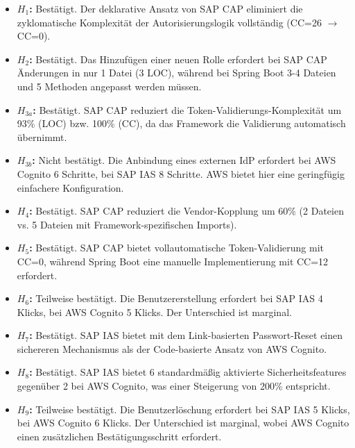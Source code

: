 \begin{itemize}
    \item \textbf{$H_1$:} Bestätigt. Der deklarative Ansatz von \ac{SAP CAP} eliminiert die zyklomatische Komplexität der Autorisierungslogik vollständig (CC=26 $\rightarrow$ CC=0).

    \item \textbf{$H_2$:} Bestätigt. Das Hinzufügen einer neuen Rolle erfordert bei \ac{SAP CAP} Änderungen in nur 1 Datei (3 LOC), während bei Spring Boot 3-4 Dateien und 5 Methoden angepasst werden müssen.

    \item \textbf{$H_{3a}$:} Bestätigt. \ac{SAP CAP} reduziert die Token-Validierungs-Komplexität um 93\% (LOC) bzw. 100\% (CC), da das Framework die Validierung automatisch übernimmt.

    \item \textbf{$H_{3b}$:} Nicht bestätigt. Die Anbindung eines externen \ac{IdP} erfordert bei \ac{AWS} Cognito 6 Schritte, bei \ac{SAP IAS} 8 Schritte. \ac{AWS} bietet hier eine geringfügig einfachere Konfiguration.

    \item \textbf{$H_4$:} Bestätigt. \ac{SAP CAP} reduziert die Vendor-Kopplung um 60\% (2 Dateien vs. 5 Dateien mit Framework-spezifischen Imports).

    \item \textbf{$H_5$:} Bestätigt. \ac{SAP CAP} bietet vollautomatische Token-Validierung mit CC=0, während Spring Boot eine manuelle Implementierung mit CC=12 erfordert.

    \item \textbf{$H_6$:} Teilweise bestätigt. Die Benutzererstellung erfordert bei \ac{SAP IAS} 4 Klicks, bei \ac{AWS} Cognito 5 Klicks. Der Unterschied ist marginal.

    \item \textbf{$H_7$:} Bestätigt. \ac{SAP IAS} bietet mit dem Link-basierten Passwort-Reset einen sichereren Mechanismus als der Code-basierte Ansatz von \ac{AWS} Cognito.

    \item \textbf{$H_8$:} Bestätigt. \ac{SAP IAS} bietet 6 standardmäßig aktivierte Sicherheitsfeatures gegenüber 2 bei \ac{AWS} Cognito, was einer Steigerung von 200\% entspricht.

    \item \textbf{$H_9$:} Teilweise bestätigt. Die Benutzerlöschung erfordert bei \ac{SAP IAS} 5 Klicks, bei \ac{AWS} Cognito 6 Klicks. Der Unterschied ist marginal, wobei \ac{AWS} Cognito einen zusätzlichen Bestätigungsschritt erfordert.
\end{itemize}

